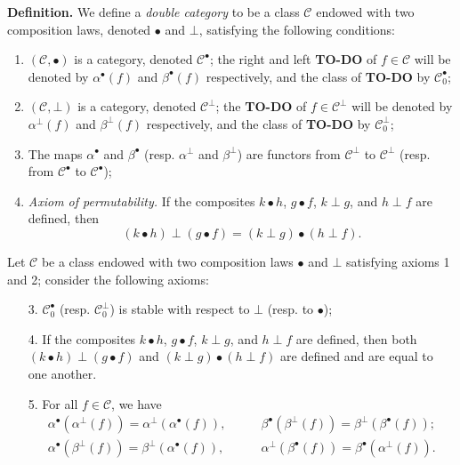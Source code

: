 \documentclass{article}
\newenvironment{rmenv}[1]
  {\phantomsection\par\medskip\noindent\textbf{#1.}\rmfamily}
  {\par\medskip}
\newcommand{\todo}{{\color{purple}\textbf{TO-DO }}}
\newcommand{\CC}{\mathcal{C}}
\newcommand{\dotc}{{\mathbin{\bullet}}}
\newcommand{\botc}{{\mathbin{\bot}}}
\begin{document}
\begin{rmenv}{Definition}
  We define a \emph{double category} to be a class $\CC$ endowed with two composition laws, denoted $\dotc$ and $\botc$, satisfying the following conditions:
  
  \begin{enumerate}
    \item $(\CC,\dotc)$ is a category, denoted $\CC^\dotc$;
      the right and left \todo of $f\in\CC$ will be denoted by $\alpha^\dotc(f)$ and $\beta^\dotc(f)$ respectively, and the class of \todo by $\CC_0^\dotc$;
    \item $(\CC,\botc)$ is a category, denoted $\CC^\botc$;
      the \todo of $f\in\CC^\botc$ will be denoted by $\alpha^\botc(f)$ and $\beta^\botc(f)$ respectively, and the class of \todo by $\CC_0^\botc$;
    \item The maps $\alpha^\dotc$ and $\beta^\dotc$ (resp. $\alpha^\botc$ and $\beta^\botc$) are functors from $\CC^\botc$ to $\CC^\botc$ (resp. from $\CC^\dotc$ to $\CC^\dotc$);
    \item \emph{Axiom of permutability.}
      If the composites $k\dotc h$, $g\dotc f$, $k\botc g$, and $h\botc f$ are defined, then
      \[
        (k\dotc h)\botc(g\dotc f)
        = (k\botc g)\dotc(h\botc f).
      \]
  \end{enumerate}

  Let $\CC$ be a class endowed with two composition laws $\dotc$ and $\botc$ satisfying axioms 1 and 2; consider the following axioms:

  \begin{enumerate}
    \item[3\textquotesingle.]
      $\CC_0^\dotc$ (resp. $\CC_0^\botc$) is stable with respect to $\botc$ (resp. to $\dotc$);
    \item[4\textquotesingle.]
      If the composites $k\dotc h$, $g\dotc f$, $k\botc g$, and $h\botc f$ are defined, then both $(k\dotc h)\botc(g\dotc f)$ and $(k\botc g)\dotc(h\botc f)$ are defined and are equal to one another.
    \item[5.]
      For all $f\in\CC$, we have
      \[
        \begin{aligned}
          \alpha^\dotc(\alpha^\botc(f))
          = \alpha^\botc(\alpha^\dotc(f)),
          &\qquad
          \beta^\dotc(\beta^\botc(f))
          = \beta^\botc(\beta^\dotc(f));
        \\\alpha^\dotc(\beta^\botc(f))
          = \beta^\botc(\alpha^\dotc(f)),
          &\qquad
          \alpha^\botc(\beta^\dotc(f))
          = \beta^\dotc(\alpha^\botc(f)).
        \end{aligned}
      \]
  \end{enumerate}
\end{rmenv}
\end{document}
